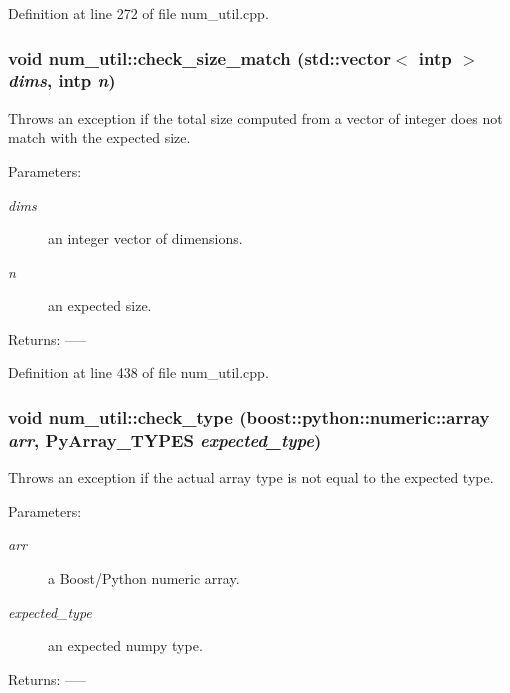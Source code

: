 Definition at line 272 of file num\_\-util.cpp.
\subsubsection{\setlength{\rightskip}{0pt plus 5cm}void num\_\-util::check\_\-size\_\-match (std::vector$<$ intp $>$ {\em dims}, intp {\em n})\hspace{0.3cm}{\tt  [inline]}}\label{namespacenum__util_a59}


Throws an exception if the total size computed from a vector of integer does not match with the expected size. \begin{Desc}
\item[Parameters:]
\begin{description}
\item[{\em dims}]an integer vector of dimensions. \item[{\em n}]an expected size. \end{description}
\end{Desc}
\begin{Desc}
\item[Returns:]-----\end{Desc}


Definition at line 438 of file num\_\-util.cpp.
\subsubsection{\setlength{\rightskip}{0pt plus 5cm}void num\_\-util::check\_\-type (boost::python::numeric::array {\em arr}, Py\-Array\_\-TYPES {\em expected\_\-type})}\label{namespacenum__util_a37}


Throws an exception if the actual array type is not equal to the expected type. \begin{Desc}
\item[Parameters:]
\begin{description}
\item[{\em arr}]a Boost/Python numeric array. \item[{\em expected\_\-type}]an expected numpy type. \end{description}
\end{Desc}
\begin{Desc}
\item[Returns:]-----\end{Desc}


